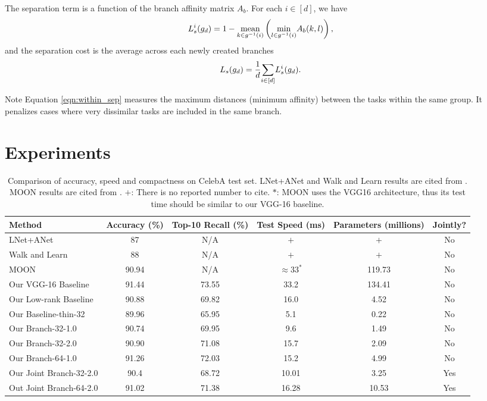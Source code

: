 \documentclass[10pt,twocolumn,letterpaper]{article}
\begin{document}
The separation term is a function of the branch affinity matrix $A_b$. For each $i \in [d]$, we have
\begin{equation}
\vspace{-2mm}
\label{eqn:within_sep}
L_s^{i}(g_d) = 1 - \underset{k \in g^{-1}(i)}{\mbox{mean}}\left(\underset{l \in g^{-1}(i) }{\min}{A_b(k,l)}\right),
\end{equation}
\noindent and the separation cost is the average across each newly created branches
\begin{equation}
\vspace{-2mm}
L_s(g_d) = \frac{1}{d} \underset{i \in [d]}{\sum} L_s^i(g_d).
\end{equation}

Note Equation \ref{eqn:within_sep} measures the maximum distances (minimum affinity) between the tasks within the same group. It penalizes cases where very dissimilar tasks are included in the same branch. 

\section{Experiments}

\begin{table*}
	\begin{center} \small
		\begin{tabular}{|l|c|c|c|c|c|}
			\hline
			\bf Method & \bf Accuracy (\%) & \bf Top-10 Recall (\%) & \bf Test Speed (ms) & \bf Parameters (millions) & \bf Jointly? \\ \hline
			LNet+ANet & 87 & N/A & $+$ & $+$ & No \\
			Walk and Learn & 88 & N/A & $+$ & $+$ & No \\
			MOON & 90.94 & N/A & $\approx 33^*$ & 119.73 & No \\ \hline
			Our VGG-16 Baseline & 91.44 & 73.55 & 33.2 & 134.41 & No \\
			Our Low-rank Baseline & 90.88 & 69.82 & 16.0 & 4.52 & No \\
			Our Baseline-thin-32 & 89.96 & 65.95 & 5.1 & 0.22 & No \\ \hline
			Our Branch-32-1.0 & 90.74 & 69.95 & 9.6 & 1.49 & No \\
			Our Branch-32-2.0 & 90.90 & 71.08 & 15.7 & 2.09 & No \\
			Our Branch-64-1.0 & 91.26 & 72.03 & 15.2 & 4.99 & No \\ \hline
			Our Joint Branch-32-2.0 & 90.4 & 68.72 & 10.01 & 3.25 & Yes \\
			Out Joint Branch-64-2.0 & 91.02 & 71.38 & 16.28 & 10.53 & Yes \\
			\hline
		\end{tabular}
	\end{center}
	\caption{Comparison of accuracy, speed and compactness on CelebA test set. LNet+ANet and Walk and Learn results are cited from \cite{wang2016walk}. MOON results are cited from \cite{rudd2016moon}. $+$: There is no reported number to cite. $*$: MOON uses the VGG16 architecture, thus its test time should be similar to our VGG-16 baseline.}
	\label{tab:celeba_complexity}
\end{table*}
\end{document}
